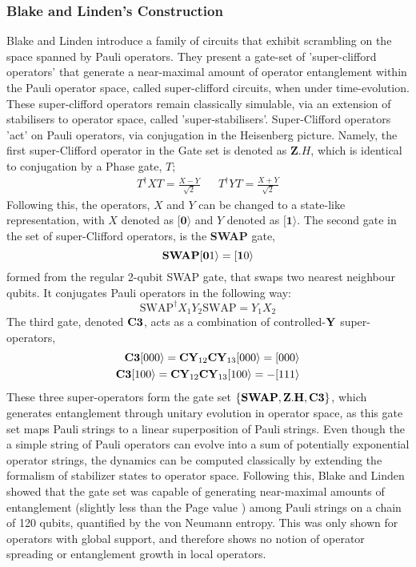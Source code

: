 \subsubsection{Blake and Linden's Construction}
Blake and Linden introduce a family of circuits that exhibit scrambling on the space spanned by Pauli operators.
They present a gate-set of 'super-clifford operators' that generate a near-maximal amount of operator entanglement
within the Pauli operator space, called super-clifford circuits, when under time-evolution. These super-clifford operators
remain classically simulable, via an extension of stabilisers to operator space, called 'super-stabilisers'.
Super-Clifford operators 'act' on Pauli operators, via conjugation in the Heisenberg picture. Namely,
the first super-Clifford operator in the Gate set is denoted as ${\mathbf Z.H}$, which is identical to
conjugation by a Phase gate, $T$;
\begin{align}\label{phasegate}
    T^{\dagger} X T = \frac{X - Y}{\sqrt{2}} &  & T^{\dagger} Y T = \frac{X + Y}{\sqrt{2}}
\end{align}
Following this, the operators, $X$ and $Y$ can be changed to a state-like representation, with
$X$ denoted as $[{\mathbf 0}\rangle$ and $Y$ denoted as $[{\mathbf 1}\rangle$.
The second gate in the set of super-Clifford operators, is the {\bf SWAP} gate,
\begin{equation}
    \text{\bf SWAP} [{\mathbf 01}\rangle = [{\mathbf 10}\rangle
\end{equation}
formed from the regular 2-qubit SWAP gate, that swaps two nearest neighbour qubits. It conjugates
Pauli operators in the following way:
\begin{equation}
    \text{SWAP}^{\dagger} X_1Y_2 \text{SWAP} = Y_1X_2
\end{equation}
The third gate, denoted $\bf C3$, acts as a combination of controlled-$\text{\bf Y}$ super-operators,
\begin{align}
    {\bf C3} [000\rangle=  {\bf CY}_{12}{\bf CY}_{13} [000\rangle = [000\rangle \\
    {\bf C3} [100\rangle=  {\bf CY}_{12}{\bf CY}_{13} [100\rangle = -[111\rangle
\end{align}
These three super-operators form the gate set $\{ {\bf SWAP}, {\bf Z.H}, {\bf C3}\}$, which generates entanglement
through unitary evolution in operator space, as this gate set maps Pauli strings to a linear superposition of Pauli strings.
Even though the a simple string of Pauli operators can evolve into a sum of potentially exponential operator strings,
the dynamics can be computed classically by extending the formalism of stabilizer states to operator space.
Following this, Blake and Linden showed that the gate set was capable of generating near-maximal amounts
of entanglement (slightly less than the Page value \cite{Page_1993}) among Pauli strings on a chain of 120 qubits,
quantified by the von Neumann entropy. This was only shown for operators with global support, and therefore
shows no notion of operator spreading or entanglement growth in local operators.

